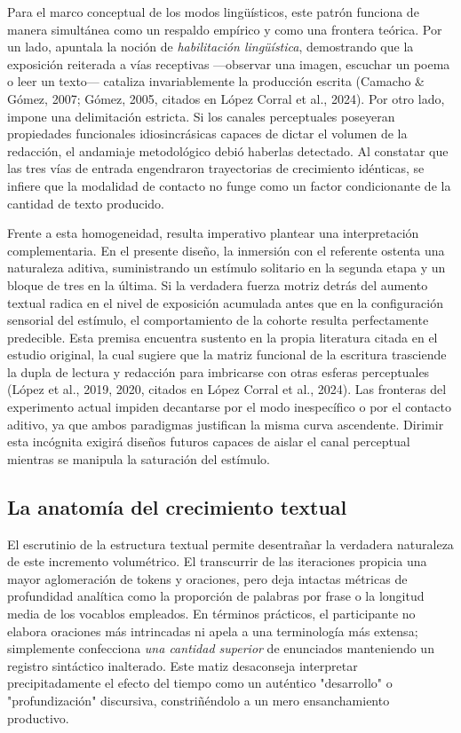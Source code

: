 \documentclass[12pt]{article}
\begin{document}
	Para el marco conceptual de los modos lingüísticos, este patrón funciona de manera simultánea como un respaldo empírico y como una frontera teórica. Por un lado, apuntala la noción de \emph{habilitación lingüística}, demostrando que la exposición reiterada a vías receptivas —observar una imagen, escuchar un poema o leer un texto— cataliza invariablemente la producción escrita (Camacho \& Gómez, 2007; Gómez, 2005, citados en López Corral et al., 2024). Por otro lado, impone una delimitación estricta. Si los canales perceptuales poseyeran propiedades funcionales idiosincrásicas capaces de dictar el volumen de la redacción, el andamiaje metodológico debió haberlas detectado. Al constatar que las tres vías de entrada engendraron trayectorias de crecimiento idénticas, se infiere que la modalidad de contacto no funge como un factor condicionante de la cantidad de texto producido.
	
	Frente a esta homogeneidad, resulta imperativo plantear una interpretación complementaria. En el presente diseño, la inmersión con el referente ostenta una naturaleza aditiva, suministrando un estímulo solitario en la segunda etapa y un bloque de tres en la última. Si la verdadera fuerza motriz detrás del aumento textual radica en el nivel de exposición acumulada antes que en la configuración sensorial del estímulo, el comportamiento de la cohorte resulta perfectamente predecible. Esta premisa encuentra sustento en la propia literatura citada en el estudio original, la cual sugiere que la matriz funcional de la escritura trasciende la dupla de lectura y redacción para imbricarse con otras esferas perceptuales (López et al., 2019, 2020, citados en López Corral et al., 2024). Las fronteras del experimento actual impiden decantarse por el modo inespecífico o por el contacto aditivo, ya que ambos paradigmas justifican la misma curva ascendente. Dirimir esta incógnita exigirá diseños futuros capaces de aislar el canal perceptual mientras se manipula la saturación del estímulo.
	
	\subsection{La anatomía del crecimiento textual}
	
	El escrutinio de la estructura textual permite desentrañar la verdadera naturaleza de este incremento volumétrico. El transcurrir de las iteraciones propicia una mayor aglomeración de tokens y oraciones, pero deja intactas métricas de profundidad analítica como la proporción de palabras por frase o la longitud media de los vocablos empleados. En términos prácticos, el participante no elabora oraciones más intrincadas ni apela a una terminología más extensa; simplemente confecciona \emph{una cantidad superior} de enunciados manteniendo un registro sintáctico inalterado. Este matiz desaconseja interpretar precipitadamente el efecto del tiempo como un auténtico "desarrollo" o "profundización" discursiva, constriñéndolo a un mero ensanchamiento productivo.
	
\end{document}
